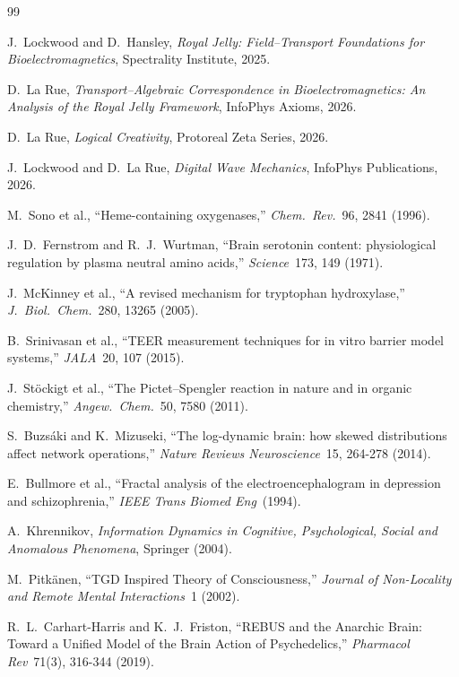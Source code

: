 \begin{thebibliography}{99}

 J.~Lockwood and D.~Hansley, \emph{Royal Jelly: Field--Transport Foundations for Bioelectromagnetics}, Spectrality Institute, 2025.

 D.~La Rue, \emph{Transport--Algebraic Correspondence in Bioelectromagnetics: An Analysis of the Royal Jelly Framework}, InfoPhys Axioms, 2026.

 D.~La Rue, \emph{Logical Creativity}, Protoreal Zeta Series, 2026.

 J.~Lockwood and D.~La Rue, \emph{Digital Wave Mechanics}, InfoPhys Publications, 2026.

 M.~Sono et al., ``Heme-containing oxygenases,'' \emph{Chem.\ Rev.}\ 96, 2841 (1996).

 J.~D.~Fernstrom and R.~J.~Wurtman, ``Brain serotonin content: physiological regulation by plasma neutral amino acids,'' \emph{Science}\ 173, 149 (1971).

 J.~McKinney et al., ``A revised mechanism for tryptophan hydroxylase,'' \emph{J.~Biol.~Chem.}\ 280, 13265 (2005).

 B.~Srinivasan et al., ``TEER measurement techniques for in vitro barrier model systems,'' \emph{JALA}\ 20, 107 (2015).

 J.~St\"ockigt et al., ``The Pictet--Spengler reaction in nature and in organic chemistry,'' \emph{Angew.~Chem.}\ 50, 7580 (2011).

 S.~Buzs\'aki and K.~Mizuseki, ``The log-dynamic brain: how skewed distributions affect network operations,'' \emph{Nature Reviews Neuroscience}\ 15, 264-278 (2014).

 E.~Bullmore et al., ``Fractal analysis of the electroencephalogram in depression and schizophrenia,'' \emph{IEEE Trans Biomed Eng}\ (1994).

 A.~Khrennikov, \emph{Information Dynamics in Cognitive, Psychological, Social and Anomalous Phenomena}, Springer (2004).

 M.~Pitk\"anen, ``TGD Inspired Theory of Consciousness,'' \emph{Journal of Non-Locality and Remote Mental Interactions}\ 1 (2002).

 R.~L.~Carhart-Harris and K.~J.~Friston, ``REBUS and the Anarchic Brain: Toward a Unified Model of the Brain Action of Psychedelics,'' \emph{Pharmacol Rev}\ 71(3), 316-344 (2019).


\end{thebibliography}

